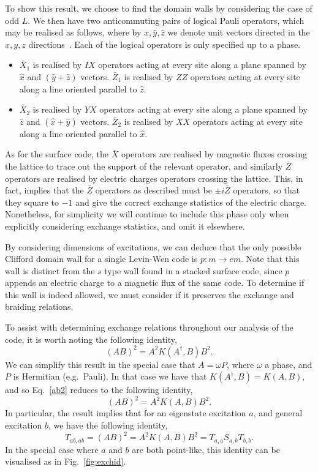\documentclass[pra,twocolumn,a4paper,nofootinbib]{revtex4-1}
\begin{document}
To show this result, we choose to find the domain walls by considering the case of odd $L$. We then have two anticommuting pairs of logical Pauli operators, which may be realised as follows, where by $\hat{x},\hat{y},\hat{z}$ we denote unit vectors directed in the $x,y,z$ directions~\cite{Haah}. Each of the logical operators is only specified up to a phase.
\begin{itemize}
\item $\bar{X}_1$ is realised by $IX$ operators acting at every site along a plane spanned by $\hat{x}$ and $(\hat{y}+\hat{z})$ vectors. $\bar{Z}_1$ is realised by $ZZ$ operators acting at every site along a line oriented parallel to $\hat{z}$.
\item $\bar{X}_2$ is realised by $YX$ operators acting at every site along a plane spanned by $\hat{z}$ and $(\hat{x}+\hat{y})$ vectors. $\bar{Z}_2$ is realised by $XX$ operators acting at every site along a line oriented parallel to $\hat{x}$.
\end{itemize}
As for the surface code, the $\bar{X}$ operators are realised by magnetic fluxes crossing the lattice to trace out the support of the relevant operator, and similarly $\bar{Z}$ operators are realised by electric charges operators crossing the lattice. This, in fact, implies that the $\bar{Z}$ operators as described must be $\pm i\bar{Z}$ operators, so that they square to $-1$ and give the correct exchange statistics of the electric charge. Nonetheless, for simplicity we will continue to include this phase only when explicitly considering exchange statistics, and omit it elsewhere.

By considering dimensions of excitations, we can deduce that the only possible Clifford domain wall for a single Levin-Wen code is $p: m \to em$. Note that this wall is distinct from the $s$ type wall found in a stacked surface code, since $p$ appends an electric charge to a magnetic flux of the same code. To determine if this wall is indeed allowed, we must consider if it preserves the exchange and braiding relations.

To assist with determining exchange relations throughout our analysis of the code, it is worth noting the following identity,
\begin{equation}
 (AB)^2=A^2 K(A^\dag, B) B^2 \label{ab2}.
 \end{equation}
 We can simplify this result in the special case that $A=\omega P$, where $\omega$ a phase, and $P$ is Hermitian (e.g.~Pauli). In that case we have that $K(A^\dag,B)=K(A,B)$, and so Eq.~\ref{ab2} reduces to the following identity,
\begin{equation}
(AB)^2=A^2K(A,B) B^2.
\end{equation}
In particular, the result implies that for an eigenstate excitation $a$, and general excitation $b$, we have the following identity,
\begin{equation}
T_{ab,ab}=(AB)^2=A^2K(A,B) B^2= T_{a,a} S_{a,b} T_{b,b} \label{eq:exchid}.
\end{equation}
In the special case where $a$ and $b$ are both point-like, this identity can be visualised as in Fig.~\ref{fig:exchid}. 
\end{document}
